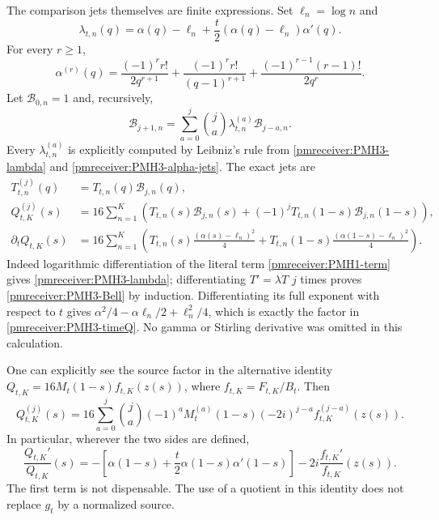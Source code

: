 The comparison jets themselves are finite expressions. Set
$\ell_n=\log n$ and
\begin{equation}\label{pmreceiver:PMH3-lambda}
 \lambda_{t,n}(q)=\alpha(q)-\ell_n
       +\frac t2(\alpha(q)-\ell_n)\alpha'(q).
\end{equation}
For every $r\ge1$,
\begin{equation}\label{pmreceiver:PMH3-alpha-jets}
 \alpha^{(r)}(q)=\frac{(-1)^r r!}{2q^{r+1}}
 +\frac{(-1)^r r!}{(q-1)^{r+1}}
 +\frac{(-1)^{r-1}(r-1)!}{2q^r}.
\end{equation}
Let $\mathcal B_{0,n}=1$ and, recursively,
\begin{equation}\label{pmreceiver:PMH3-Bell}
 \mathcal B_{j+1,n}
 =\sum_{a=0}^j\binom ja\lambda_{t,n}^{(a)}\mathcal B_{j-a,n}.
\end{equation}
Every $\lambda_{t,n}^{(a)}$ is explicitly computed by Leibniz's rule
from \eqref{pmreceiver:PMH3-lambda} and \eqref{pmreceiver:PMH3-alpha-jets}. The exact jets are
\begin{align}
 T_{t,n}^{(j)}(q)&=T_{t,n}(q)\mathcal B_{j,n}(q),
 \label{pmreceiver:PMH3-term-jets}\\
 Q_{t,K}^{(j)}(s)&=16\sum_{n=1}^K
 \left(T_{t,n}(s)\mathcal B_{j,n}(s)
 +(-1)^jT_{t,n}(1-s)\mathcal B_{j,n}(1-s)\right),
 \label{pmreceiver:PMH3-Qjets}\\
 \partial_tQ_{t,K}(s)&=16\sum_{n=1}^K
 \left(T_{t,n}(s)\frac{(\alpha(s)-\ell_n)^2}{4}
 +T_{t,n}(1-s)\frac{(\alpha(1-s)-\ell_n)^2}{4}\right).
 \label{pmreceiver:PMH3-timeQ}
\end{align}
Indeed logarithmic differentiation of the literal term
\eqref{pmreceiver:PMH1-term} gives \eqref{pmreceiver:PMH3-lambda}; differentiating
$T'=\lambda T$ $j$ times proves \eqref{pmreceiver:PMH3-Bell} by induction.
Differentiating its full exponent with respect to $t$ gives
$\alpha^2/4-\alpha\ell_n/2+\ell_n^2/4$, which is exactly the
factor in \eqref{pmreceiver:PMH3-timeQ}. No gamma or Stirling derivative was
omitted in this calculation.

One can explicitly see the source factor in the alternative
identity $Q_{t,K}=16M_t(1-s)f_{t,K}(z(s))$, where
$f_{t,K}=F_{t,K}/B_t$. Then
\begin{equation}\label{pmreceiver:PMH3-Bjet}
 Q_{t,K}^{(j)}(s)=16\sum_{a=0}^j\binom ja(-1)^a
 M_t^{(a)}(1-s)(-2i)^{j-a}f_{t,K}^{(j-a)}(z(s)).
\end{equation}
In particular, wherever the two sides are defined,
\begin{equation}\label{pmreceiver:PMH3-logB}
 \frac{Q_{t,K}'}{Q_{t,K}}(s)
 =-\left[\alpha(1-s)+\frac t2\alpha(1-s)\alpha'(1-s)\right]
       -2i\frac{f_{t,K}'}{f_{t,K}}(z(s)).
\end{equation}
The first term is not dispensable. The use of a quotient in this
identity does not replace $g_t$ by a normalized source.


